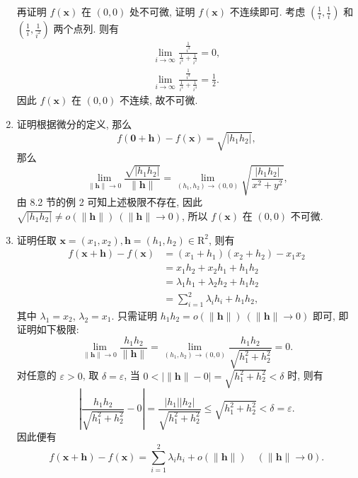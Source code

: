 \begin{enumerate}
        再证明 $f(\boldsymbol{x})$ 在 $(0, 0)$ 处不可微, 证明 $f(\boldsymbol{x})$ 不连续即可. 考虑 $\displaystyle{\left(\frac1i, \frac1i\right)}$ 和 $\displaystyle{\left(\frac1i, \frac{1}{i^2}\right)}$ 两个点列.
        则有
        \begin{gather*}
            \lim_{i\to\infty}\frac{\frac{1}{i^3}}{\frac{1}{i^4} + \frac{1}{i^2}} = 0, \\
            \lim_{i\to\infty}\frac{\frac{1}{i^4}}{\frac{1}{i^4} + \frac{1}{i^4}} = \frac12.   
        \end{gather*}
        因此 $f(\boldsymbol{x})$ 在 $(0, 0)$ 不连续, 故不可微.
    \item %
        {\heiti 证明}\quad 根据微分的定义, 那么
        \[
            f(\boldsymbol{0} + \boldsymbol{h}) - f(\boldsymbol{x}) = \sqrt{|h_1h_2|},    
        \] 那么
        \[
            \lim_{\|\boldsymbol{h}\|\to0}\frac{\sqrt{|h_1h_2|}}{\|\boldsymbol{h}\|} = \lim_{(h_1,h_2)\to(0,0)}\sqrt{\frac{|h_1h_2|}{x^2+y^2}},   
        \]
        由 8.2 节的例 2 可知上述极限不存在, 因此 $\sqrt{|h_1h_2|} \neq o(\|\boldsymbol{h}\|)\ (\|\boldsymbol{h}\|\to0)$, 所以 $f(\boldsymbol{x})$ 在 $(0,0)$ 不可微.
    \item %
        {\heiti 证明}\quad 任取 $\boldsymbol{x} = (x_1, x_2), \boldsymbol{h} = (h_1, h_2) \in \mathrm{R}^2$, 则有
        \begin{align*}
            f(\boldsymbol{x} + \boldsymbol{h}) - f(\boldsymbol{x}) &= (x_1 + h_1)(x_2 + h_2) - x_1x_2 \\
            &= x_1h_2 + x_2h_1 + h_1h_2 \\
            &= \lambda_1h_1 + \lambda_2h_2 + h_1h_2 \\
            &= \sum_{i=1}^2\lambda_ih_i + h_1h_2,   
        \end{align*}
        其中 $\lambda_1 = x_2$, $\lambda_2 = x_1$. 只需证明 $h_1h_2 = o(\|\boldsymbol{h}\|)\ (\|\boldsymbol{h}\|\to0)$ 即可, 即证明如下极限:
        \[
            \lim_{\|\boldsymbol{h}\|\to0}\frac{h_1h_2}{\|\boldsymbol{h}\|} = \lim_{(h_1, h_2) \to (0, 0)}\frac{h_1h_2}{\sqrt{h_1^2 + h_2^2}} = 0.    
        \]
        对任意的 $\varepsilon > 0$, 取 $\delta = \varepsilon$, 当 $0 < |\|\boldsymbol{h}\| - 0| = \sqrt{h_1^2 + h_2^2} < \delta$ 时, 则有
        \[
            \left| \frac{h_1h_2}{\sqrt{h_1^2+h_2^2}} - 0 \right| = \frac{|h_1||h_2|}{\sqrt{h_1^2+h_2^2}} \leqslant \sqrt{h_1^2 + h_2^2} < \delta = \varepsilon.   
        \]
        因此便有
        \[
            f(\boldsymbol{x} + \boldsymbol{h}) - f(\boldsymbol{x}) = \sum_{i=1}^2\lambda_ih_i + o(\|\boldsymbol{h}\|)\quad (\|\boldsymbol{h}\| \to 0).
\]
\end{enumerate}
